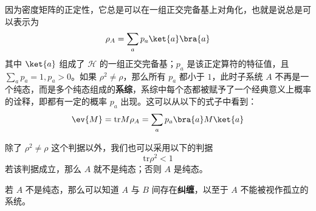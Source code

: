 因为密度矩阵的正定性，它总是可以在一组正交完备基上对角化，也就是说总是可以表示为
\begin{equation}
\rho_A=\sum_a p_a\ket{a}\bra{a}
\end{equation}
其中 $\ket{a}$ 组成了 $\mathcal{H}$ 的一组正交完备基；$p_a$ 是该正定算符的特征值，且 $\sum_a p_a=1,p_a>0$。如果 $\rho^2\neq \rho$，那么所有 $p_a$ 都小于 $1$，此时子系统 $A$ 不再是一个纯态，而是多个纯态组成的\textbf{系综}，系综中每个态都被赋予了一个经典意义上概率的诠释，即都有一定的概率 $p_a$ 出现。这可以从以下的式子中看到：
\begin{equation}
\ev{M}=\text{tr} M\rho_A = \sum_a p_a \bra{a}M\ket{a}
\end{equation}


除了 $\rho^2\neq \rho$ 这个判据以外，我们也可以采用以下的判据
\begin{equation}\label{eq_partra_2}
\text{tr} \rho^2 <1
\end{equation}
若该判据成立，那么 $A$ 就不是纯态；否则 $A$ 是纯态。

若 $A$ 不是纯态，那么可以知道 $A$ 与 $B$ 间存在\textbf{纠缠}，以至于 $A$ 不能被视作孤立的系统。